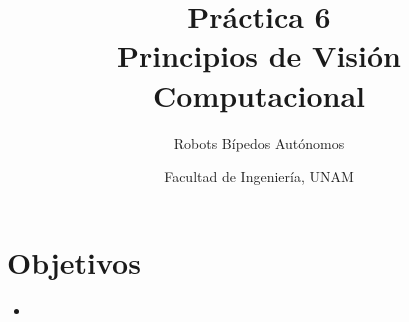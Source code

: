 \documentclass[letterpaper,12pt]{article}
\title{Práctica 6 \\ Principios de Visión Computacional}
\author{Robots Bípedos Autónomos}
\date{Facultad de Ingeniería, UNAM}
\begin{document}
\renewcommand{\tablename}{Tabla}
\maketitle
\section*{Objetivos}
\begin{itemize}
\item 
\end{itemize}
\end{document}
